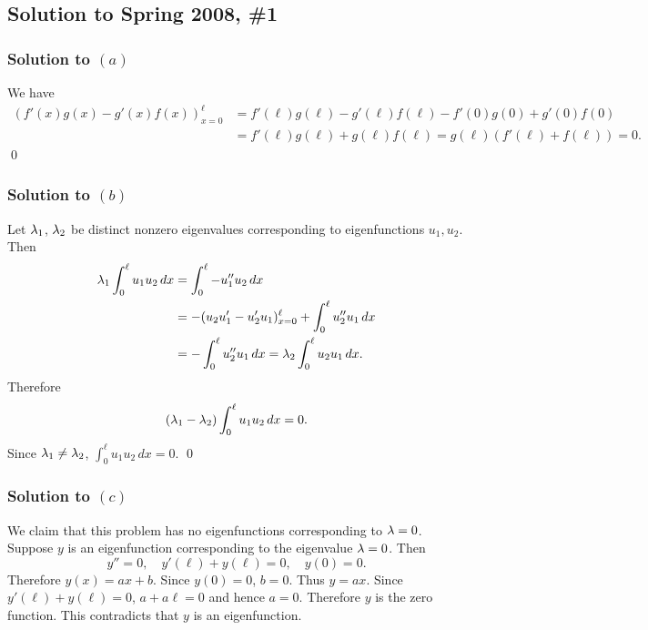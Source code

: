 \subsection*{Solution to Spring 2008, \#1}\label{s081}
\subsubsection*{Solution to $(a)$}
We have
\begin{align*}
(f'(x)g(x) - g'(x)f(x))_{x = 0}^{\ell} &= f'(\ell)g(\ell) - g'(\ell)f(\ell) - f'(0)g(0) + g'(0)f(0)\\
&= f'(\ell)g(\ell) + g(\ell)f(\ell) = g(\ell)(f'(\ell) + f(\ell)) = 0.
\end{align*}
\hfill\qed

\subsubsection*{Solution to $(b)$}
Let $\lambda_{1}$, $\lambda_{2}$ be distinct nonzero eigenvalues corresponding to eigenfunctions $u_{1}, u_{2}$.
Then
\begin{align*}
\lambda_{1}\int_{0}^{\ell}u_{1}u_{2}\, dx &= \int_{0}^{\ell}-u_{1}''u_{2}\, dx\\
&= -(u_2u_1' - u_2'u_1)_{x = 0}^{\ell} + \int_{0}^{\ell}u_{2}''u_{1}\, dx\\
&= -\int_{0}^{\ell}u_{2}''u_{1}\, dx = \lambda_{2}\int_{0}^{\ell}u_{2}u_{1}\, dx.
\end{align*}
Therefore
$$(\lambda_{1} - \lambda_{2})\int_{0}^{\ell}u_{1}u_{2}\, dx = 0.$$
Since $\lambda_{1} \neq \lambda_{2}$, $\int_{0}^{\ell}u_{1}u_{2}\, dx = 0$.
\hfill\qed

\subsubsection*{Solution to $(c)$}
We claim that this problem has no eigenfunctions corresponding to $\lambda = 0$.
Suppose $y$ is an eigenfunction corresponding to the eigenvalue $\lambda = 0$.
Then
$$y'' = 0, \quad y'(\ell) + y(\ell) = 0, \quad y(0) = 0.$$
Therefore $y(x) = ax + b$. Since $y(0) = 0$, $b = 0$. Thus $y = ax$. Since $y'(\ell) + y(\ell) = 0$,
$a + a\ell = 0$ and hence $a = 0$. Therefore $y$ is the zero function.
This contradicts that $y$ is an eigenfunction.

